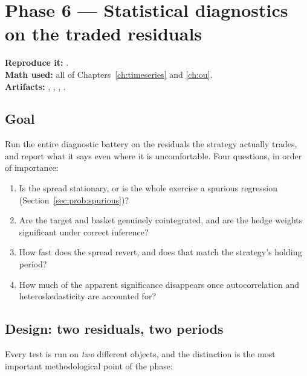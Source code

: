 \section{Phase 6 --- Statistical diagnostics on the traded residuals}
\label{ch:phase6}

\textbf{Reproduce it:} .\\
\textbf{Math used:} all of Chapters~\ref{ch:timeseries} and \ref{ch:ou}.\\
\textbf{Artifacts:} ,
,
,
.

\subsection{Goal}

Run the entire diagnostic battery on the residuals the strategy actually trades, and
report what it says even where it is uncomfortable. Four questions, in order of
importance:
\begin{enumerate}
  \item Is the spread stationary, or is the whole exercise a spurious regression
    (Section~\ref{sec:prob:spurious})?
  \item Are the target and basket genuinely cointegrated, and are the hedge weights
    significant under correct inference?
  \item How fast does the spread revert, and does that match the strategy's holding
    period?
  \item How much of the apparent significance disappears once autocorrelation and
    heteroskedasticity are accounted for?
\end{enumerate}

\subsection{Design: two residuals, two periods}

Every test is run on \emph{two} different objects, and the distinction is the most
important methodological point of the phase:

